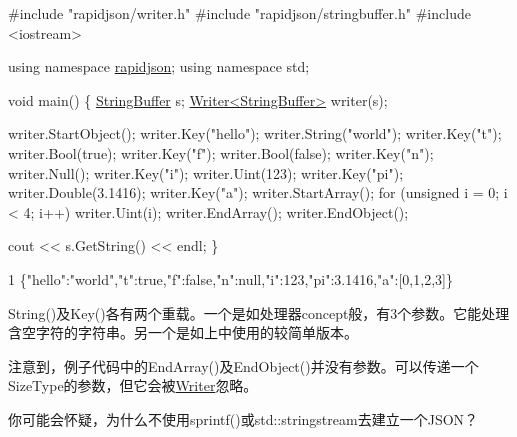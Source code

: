 \begin{DoxyCode}
\textcolor{preprocessor}{#include "rapidjson/writer.h"}
\textcolor{preprocessor}{#include "rapidjson/stringbuffer.h"}
\textcolor{preprocessor}{#include <iostream>}

\textcolor{keyword}{using namespace }\hyperlink{namespacerapidjson}{rapidjson};
\textcolor{keyword}{using namespace }std;

\textcolor{keywordtype}{void} main() \{
    \hyperlink{class_generic_string_buffer}{StringBuffer} s;
    \hyperlink{class_writer}{Writer<StringBuffer>} writer(s);

    writer.StartObject();
    writer.Key(\textcolor{stringliteral}{"hello"});
    writer.String(\textcolor{stringliteral}{"world"});
    writer.Key(\textcolor{stringliteral}{"t"});
    writer.Bool(\textcolor{keyword}{true});
    writer.Key(\textcolor{stringliteral}{"f"});
    writer.Bool(\textcolor{keyword}{false});
    writer.Key(\textcolor{stringliteral}{"n"});
    writer.Null();
    writer.Key(\textcolor{stringliteral}{"i"});
    writer.Uint(123);
    writer.Key(\textcolor{stringliteral}{"pi"});
    writer.Double(3.1416);
    writer.Key(\textcolor{stringliteral}{"a"});
    writer.StartArray();
    \textcolor{keywordflow}{for} (\textcolor{keywordtype}{unsigned} i = 0; i < 4; i++)
        writer.Uint(i);
    writer.EndArray();
    writer.EndObject();

    cout << s.GetString() << endl;
\}
\end{DoxyCode}



\begin{DoxyCode}
1 \{"hello":"world","t":true,"f":false,"n":null,"i":123,"pi":3.1416,"a":[0,1,2,3]\}
\end{DoxyCode}


{\ttfamily String()}及{\ttfamily Key()}各有两个重载。一个是如处理器concept般，有3个参数。它能处理含空字符的字符串。另一个是如上中使用的较简单版本。

注意到，例子代码中的{\ttfamily End\+Array()}及{\ttfamily End\+Object()}并没有参数。可以传递一个{\ttfamily Size\+Type}的参数，但它会被{\ttfamily \hyperlink{class_writer}{Writer}}忽略。

你可能会怀疑，为什么不使用{\ttfamily sprintf()}或{\ttfamily std\+::stringstream}去建立一个\+J\+S\+O\+N？


